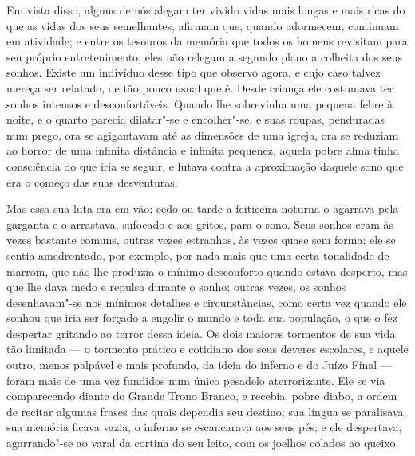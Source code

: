 Em vista disso, alguns de nós alegam ter vivido vidas mais longas e mais
ricas do que as vidas dos seus semelhantes; afirmam que, quando
adormecem, continuam em atividade; e entre os tesouros da memória que
todos os homens revisitam para seu próprio entretenimento, eles não
relegam a segundo plano a colheita dos seus sonhos.  Existe um
indivíduo desse tipo que observo agora, e cujo caso talvez mereça ser
relatado, de tão pouco usual que é.  Desde criança ele costumava ter
sonhos intensos e desconfortáveis.  Quando lhe sobrevinha uma pequena
febre à noite, e o quarto parecia dilatar"-se e encolher"-se, e suas
roupas, penduradas num prego, ora se agigantavam até as dimensões de
uma igreja, ora se reduziam ao horror de uma infinita distância e
infinita pequenez, aquela pobre alma tinha consciência do que iria se
seguir, e lutava contra a aproximação daquele sono que era o começo das
suas desventuras.

Mas essa sua luta era em vão; cedo ou tarde a feiticeira noturna o
agarrava pela garganta e o arrastava, sufocado e aos gritos, para o
sono.  Seus sonhos eram às vezes bastante comuns, outras vezes
estranhos, às vezes quase sem forma; ele se sentia amedrontado, por
exemplo, por nada mais que uma certa tonalidade de marrom, que não lhe
produzia o mínimo desconforto quando estava desperto, mas que lhe dava
medo e repulsa durante o sonho; outras vezes, os sonhos desenhavam"-se
nos mínimos detalhes e circunstâncias, como certa vez quando ele sonhou
que iria ser forçado a engolir o mundo e toda sua população, o que o
fez despertar gritando ao terror dessa ideia.  Os dois maiores
tormentos de sua vida tão limitada --- o tormento prático e cotidiano dos
seus deveres escolares, e aquele outro, menos palpável e mais profundo,
da ideia do inferno e do Juízo Final --- foram mais de uma vez fundidos
num único pesadelo aterrorizante.  Ele se via comparecendo diante do
Grande Trono Branco, e recebia, pobre diabo, a ordem de recitar algumas
frases das quais dependia seu destino; sua língua se paralisava, sua
memória ficava vazia, o inferno se escancarava aos seus pés; e ele
despertava, agarrando"-se ao varal da cortina do seu leito, com os
joelhos colados ao queixo.

